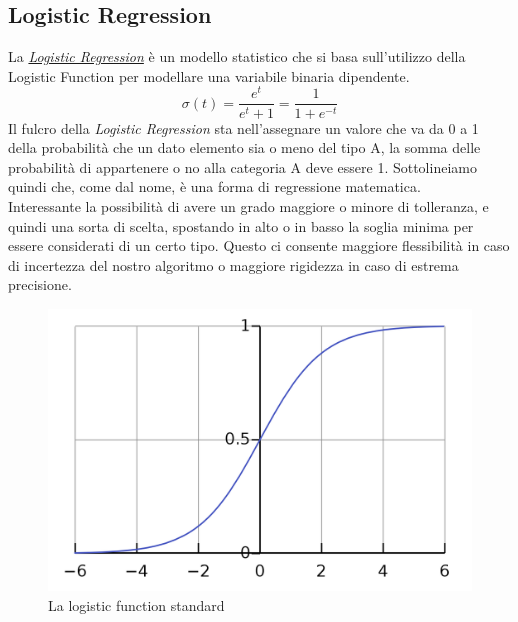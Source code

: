 \subsection{Logistic Regression}
La \href{https://en.wikipedia.org/wiki/Logistic_regression}{\textit{Logistic Regression}}  è un modello statistico che si basa sull'utilizzo della Logistic Function per modellare una variabile binaria dipendente.
\begin{equation}
\sigma (t)={\frac {e^{t}}{e^{t}+1}}={\frac {1}{1+e^{-t}}}
\end{equation}
Il fulcro della \textit{Logistic Regression} sta nell'assegnare un valore che va da 0 a 1 della probabilità che un dato elemento sia o meno del tipo A, la somma delle probabilità di appartenere o no alla categoria A deve essere 1. Sottolineiamo quindi che, come dal nome, è una forma di regressione matematica.\\ Interessante la possibilità di avere un grado maggiore o minore di tolleranza, e quindi una sorta di scelta, spostando in alto o in basso la soglia minima per essere considerati di un certo tipo. Questo ci consente maggiore flessibilità in caso di incertezza del nostro algoritmo o maggiore rigidezza in caso di estrema precisione.
\begin{figure}[H]
\centering
\includegraphics[scale=0.25]{img/logisticFunction.png}
\caption{La logistic function standard}
\end{figure}
